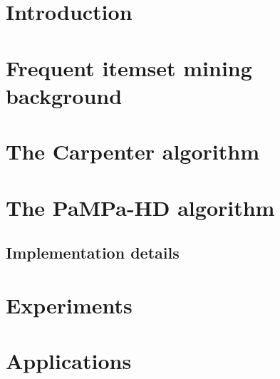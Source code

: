 
\section{Introduction}
\label{Introduction}



\section{Frequent itemset mining background}
\label{Preliminaries}



\section{The Carpenter algorithm}
\label{Carpenter algorithm}



\section{The PaMPa-HD algorithm}
\label{Distributed implementation outline}




\subsection{Implementation details}
\label{MapReduce Carpenter}

%
%


\section{Experiments}
\label{Experiments}




%


\section{Applications}
\label{Applications}




